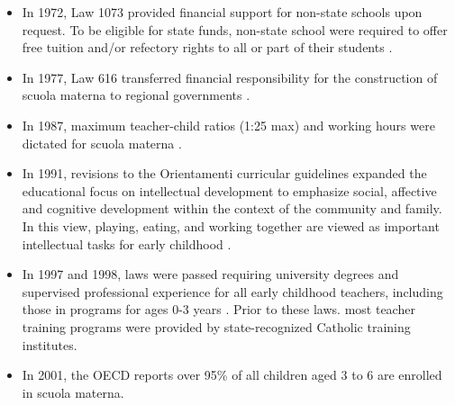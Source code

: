 \documentclass{article}
\theoremstyle{definition}
\theoremstyle{remark}
\begin{document}
\begin{itemize}
\item In 1972, Law 1073 provided financial support for non-state schools upon request. To be eligible for state funds, non-state school were required to offer free tuition and/or refectory rights to all or part of their students \citep{Corsaro_1996_Early-Edu}.

\item In 1977, Law 616 transferred financial responsibility for the construction of scuola materna to regional governments \citep{OECD_2001_Italy-Country-Note}.

\item In 1987, maximum teacher-child ratios (1:25 max) and working hours were dictated for scuola materna \citep{OECD_2001_Italy-Country-Note}.

\item In 1991, revisions to the Orientamenti curricular guidelines expanded the educational focus on intellectual development to emphasize social, affective and cognitive development within the context of the community and family. In this view, playing, eating, and working together are viewed as important intellectual tasks for early childhood \citep{Corsaro_1996_Early-Edu}.

\item In 1997 and 1998, laws were passed requiring university degrees and supervised professional experience for all early childhood teachers, including those in programs for ages 0-3 years \citep{Ghedini_2001_Ital-Natl-Policy}. Prior to these laws. most teacher training programs were provided by state-recognized Catholic training institutes. 

\item In 2001, the OECD reports over 95\% of all children aged 3 to 6 are enrolled in scuola materna.  
\end{itemize}

\clearpage
\end{document}
